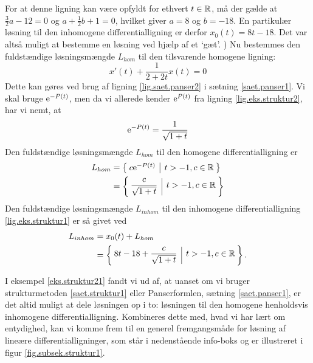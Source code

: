 \begin{example}
\begin{equation}
\end{equation}
For at denne ligning kan være opfyldt for ethvert $ t \in \mathbb{R} $, må der gælde at $ \frac{3}{2}a - 12 = 0 $ og $ a + \frac{1}{2}b + 1=0 $, hvilket giver $ a=8 $ og $ b = -18 $. En partikulær løsning til den inhomogene differentialligning er derfor $ x_0(t) = 8t - 18 $. Det var altså muligt at bestemme en løsning ved hjælp af et `gæt'. ) Nu bestemmes den fuldstændige løsningsmængde $ L_{hom} $ til den tilsvarende homogene ligning:
\begin{equation} 
x'(t) + \frac{1}{2+2t}x(t) = 0 
\end{equation}
Dette kan gøres ved brug af ligning \eqref{lig.saet.panser2} i sætning \ref{saet.panser1}. Vi skal bruge $ \mathrm{e}^{-P(t)} $, men da vi allerede kender $ \mathrm{e}^{P(t)} $ fra ligning \eqref{lig.eks.struktur2}, har vi nemt, at
\begin{equation}
\mathrm{e}^{-P(t)} = \frac{1}{\sqrt{1+t}}
\end{equation}
Den fuldstændige løsningsmængde $ L_{hom} $ til den homogene differentialligning er
\begin{equation}
\begin{aligned}
L_{hom} &= \left\lbrace \hspace*{-1mm} \begin{array}{c|c} c\mathrm{e}^{-P(t)} & t > -1, c \in \mathbb{R} \end{array} \hspace*{-1mm} \right\rbrace \\
&= \left\lbrace \hspace*{-1mm} \begin{array}{c|c} \dfrac{c}{\sqrt{1+t}} & t>-1, c \in \mathbb{R} \end{array} \hspace*{-1mm} \right\rbrace
\end{aligned}
\end{equation}
Den fuldstændige løsningsmængde $ L_{inhom} $ til den inhomogene differentialligning \eqref{lig.eks.struktur1} er så givet ved
\begin{equation}
\begin{aligned}
L_{inhom} &= x_0(t) + L_{hom} \\
&= \left\lbrace \hspace*{-1mm} \begin{array}{c|c} 8t - 18 + \dfrac{c}{\sqrt{1+t}} & t>-1, c \in \mathbb{R} \end{array} \hspace*{-1mm} \right\rbrace.
\end{aligned}
\end{equation}
\end{example}

I eksempel \ref{eks.struktur21} fandt vi ud af, at uanset om vi bruger strukturmetoden \ref{saet.struktur1} eller Panserformlen, sætning \ref{saet.panser1}, er det altid muligt at dele løsningen op i to: løsningen til den homogene henholdsvis inhomogene differentialligning. Kombineres dette med, hvad vi har lært om entydighed, kan vi komme frem til en generel fremgangsmåde for løsning af lineære differentialligninger, som står i nedenstående info-boks og er illustreret i figur \ref{fig.subsek.struktur1}.

